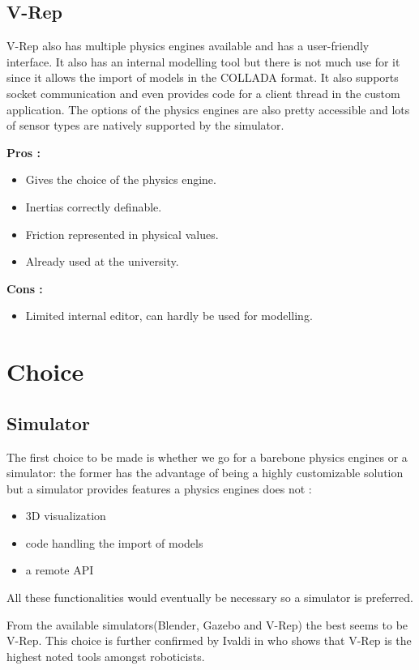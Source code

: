 \subsection{V-Rep}
V-Rep also has multiple physics engines available and has a user-friendly interface. It also has an internal modelling tool but there is not much use for it since it allows the import of models in the COLLADA format. It also supports socket communication and even provides code for a client thread in the custom application. The options of the physics engines are also pretty accessible and lots of sensor types are natively supported by the simulator.

\textbf{Pros :}
\begin{itemize}
\item Gives the choice of the physics engine.
\item Inertias correctly definable.
\item Friction represented in physical values.
\item Already used at the university.
\end{itemize}

\textbf{Cons :}
\begin{itemize}
\item Limited internal editor, can hardly be used for modelling.
\end{itemize}

\section{Choice}
\subsection{Simulator}
The first choice to be made is whether we go for a barebone physics engines or a simulator: the former has the advantage of being a highly customizable solution but a simulator provides features a physics engines does not :\begin{itemize}
\item 3D visualization
\item code handling the import of models
\item a remote API
\end{itemize}
All these functionalities would eventually be necessary so a simulator is preferred. 

From the available simulators(Blender, Gazebo and V-Rep) the best seems to be V-Rep. This choice is further confirmed by Ivaldi in \cite{ivaldi2014tools} who shows that V-Rep is the highest noted tools amongst roboticists.

